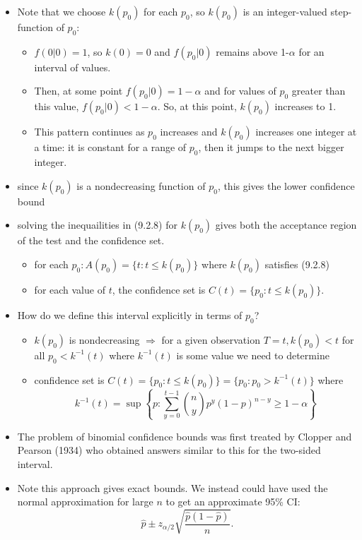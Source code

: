 \documentclass[11pt,]{article}
\def\phat{{\widehat p}}
\begin{document}
\begin{itemize}
\item Note that we choose $k(p_0)$ for each $p_0$, so $k(p_0)$ is an integer-valued step-function of $p_0$:
\begin{itemize}
\item $f(0 | 0) = 1$, so $k(0) = 0$ and $f(p_0 | 0)$ remains above 1-$\alpha$ for an interval of values.
\item Then, at some point $f(p_0 | 0) = 1 - \alpha$ and for values of $p_0$ greater than this value, $f(p_0 | 0) < 1 - \alpha$. So, at this point, $k(p_0)$ increases to 1.
\item This pattern continues as $p_0$ increases and $k(p_0)$ increases one integer at a time: it is constant for a range of $p_0$, then it jumps to the next bigger integer.
\end{itemize}
\item since $k(p_0)$ is a nondecreasing function of $p_0$, this gives the lower confidence bound
\item solving the inequailities in (9.2.8) for $k(p_0)$ gives both the acceptance region of the test and the confidence set.
\begin{itemize}
\item for each $p_0: A(p_0) = \{t: t \leq k(p_0)\}$ where $k(p_0)$ satisfies (9.2.8)
\item for each value of $t$, the confidence set is $C(t) = \{ p_0: t \leq k(p_0)\}$.
\end{itemize}
\item How do we define this interval explicitly in terms of $p_0$?
\begin{itemize}
\item $k(p_0)$ is nondecreasing $\Rightarrow$ for a given observation $T=t, k(p_0) < t$ for all $p_0 < k^{-1}(t)$  where $k^{-1} (t)$ is some value we need to determine
\item confidence set is $C(t) = \{ p_0: t \leq k(p_0)\} = \{ p_0: p_0 > k^{-1}(t)\}$ where
$$k^{-1}(t) = \sup \left\{ p: \sum_{y=0}^{t-1} {n \choose y} p^{y} (1-p)^{n-y} \geq 1- \alpha \right\}$$
\end{itemize}
\item The problem of binomial confidence bounds was first treated by Clopper and Pearson (1934) who obtained answers similar to this for the two-sided interval.
\item Note this approach gives exact bounds. We instead could have used the normal approximation for large $n$ to get an approximate 95\% CI:
$$ \phat \pm z_{\alpha/2} \sqrt{\frac{\phat(1-\phat)}{n}}.$$
\end{itemize}
\end{document}
